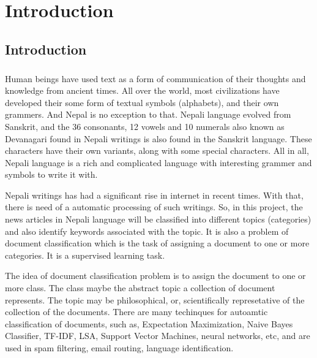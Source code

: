 \documentclass[12pt]{report}
\begin{document}
    \tableofcontents


    \newpage
    \chapter{ Introduction}
    
    \section{Introduction}
    \paragraph{}
        Human beings have used text as a form of communication of their thoughts and knowledge from ancient times. All over the world, most civilizations have developed their some form of textual symbols 
        (alphabets), and  their own grammers.
        And Nepal is no exception to that. Nepali language evolved from Sanskrit, and the 36 consonants, 12 vowels and 10 numerals also known as Devanagari found in Nepali writings is also found 
        in the Sanskrit language. 
        These characters have their own variants, along with some special characters. All in all, Nepali language is a rich and complicated language with interesting grammer and symbols to write it with.
        
        Nepali writings has had a significant rise in internet in recent times. With that, there is need of a automatic processing of such writings.          
        So, in this project, the news articles in Nepali language will be classified into different topics (categories) and also identify keywords associated with the topic.
        It is also a problem of document classification which is the task of assigning a document to one or more categories. It is a supervised learning task. 

        The idea of document classification problem is to assign the document to one or more class. The class maybe the abstract topic a collection of document represents. The topic may be philosophical, or, scientifically represetative
        of the collection of the documents. There are many techinques for autoamtic classification of documents, such as, Expectation Maximization, Naive Bayes Classifier, TF-IDF, LSA, Support Vector Machines,
        neural networks, etc, and are used in spam filtering, email routing, language identification\cite{wikipedia2021}. 
        
\end{document}
